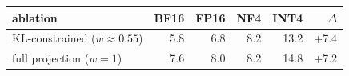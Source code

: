 \begin{tabular}{lrrrrr}
\toprule
ablation & BF16 & FP16 & NF4 & INT4 & $\Delta$ \\
\midrule
KL-constrained ($w\!\approx\!0.55$) & 5.8 & 6.8 & 8.2 & 13.2 & +7.4 \\
full projection ($w\!=\!1$) & 7.6 & 8.0 & 8.2 & 14.8 & +7.2 \\
\bottomrule
\end{tabular}
